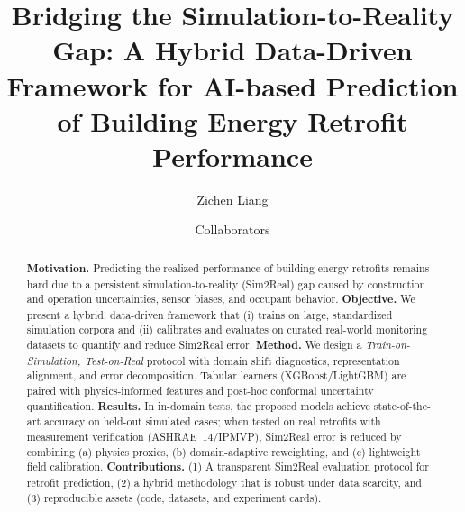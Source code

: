 ﻿\documentclass{article}
\title{Bridging the Simulation-to-Reality Gap: A Hybrid Data-Driven Framework for AI-based Prediction of Building Energy Retrofit Performance}
\author{Zichen Liang \and Collaborators}
\date{}
\begin{document}
\maketitle

\begin{abstract}
\textbf{Motivation.} Predicting the realized performance of building energy retrofits remains hard due to a persistent simulation-to-reality (Sim2Real) gap caused by construction and operation uncertainties, sensor biases, and occupant behavior.
\textbf{Objective.} We present a hybrid, data-driven framework that (i) trains on large, standardized simulation corpora and (ii) calibrates and evaluates on curated real-world monitoring datasets to quantify and reduce Sim2Real error.
\textbf{Method.} We design a \emph{Train-on-Simulation, Test-on-Real} protocol with domain shift diagnostics, representation alignment, and error decomposition. Tabular learners (XGBoost/LightGBM) are paired with physics-informed features and post-hoc conformal uncertainty quantification. 
\textbf{Results.} In in-domain tests, the proposed models achieve state-of-the-art accuracy on held-out simulated cases; when tested on real retrofits with measurement verification (ASHRAE~14/IPMVP), Sim2Real error is reduced by combining (a) physics proxies, (b) domain-adaptive reweighting, and (c) lightweight field calibration.
\textbf{Contributions.} (1) A transparent Sim2Real evaluation protocol for retrofit prediction, (2) a hybrid methodology that is robust under data scarcity, and (3) reproducible assets (code, datasets, and experiment cards).
\end{abstract}
\end{document}
